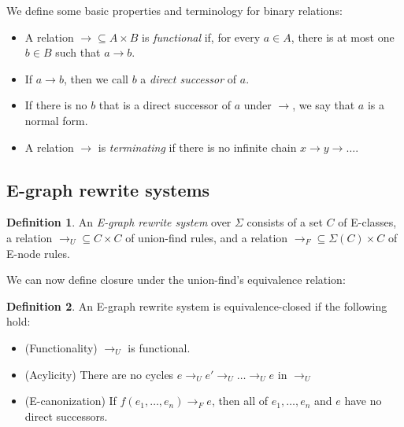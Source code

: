 \documentclass[12pt,a4paper,twoside,openright]{report}
\numberwithin{equation}{chapter}		%
\numberwithin{figure}{chapter}			%
\numberwithin{table}{chapter}			%
\theoremstyle{definition}
\newtheorem*{definition}{Definition}
\theoremstyle{plain}
\begin{document}
\begin{itemize}
We define some basic properties and terminology for binary relations:
\begin{itemize}
\item A relation $\rightarrow \subseteq A \times B$ is \emph{functional} if, for every $a \in A$, there is at most one $b \in B$ such that $a \rightarrow b$.
\item If $a \rightarrow b$, then we call $b$ a \emph{direct successor} of $a$.
\item If there is no $b$ that is a direct successor of $a$ under $\rightarrow$, we say that $a$ is a normal form.
\item A relation $\rightarrow$ is \emph{terminating} if there is no infinite chain $x \rightarrow y \rightarrow \ldots$.
\end{itemize}
\end{itemize}

\subsection{E-graph rewrite systems}
\begin{definition}
An \emph{E-graph rewrite system} over $\Sigma$ consists of a set $C$ of E-classes, a relation $\rightarrow_U \subseteq C \times C$ of union-find rules, and a relation $\rightarrow_F \subseteq \Sigma(C) \times C$ of E-node rules. 
\end{definition}

We can now define closure under the union-find's equivalence relation:

\begin{definition}
An E-graph rewrite system is equivalence-closed if the following hold:
\begin{itemize}
\item \label{uffunc} (Functionality) $\rightarrow_U$ is functional.
\item (Acylicity) There are no cycles $e \rightarrow_U e' \rightarrow_U \ldots \rightarrow_U e$ in $\rightarrow_U$
\item (E-canonization) If $f(e_1, \ldots, e_n) \rightarrow_F e$, then all of $e_1, \ldots, e_n$ and $e$ have no direct successors.
\end{itemize}
\end{definition}
\end{document}
